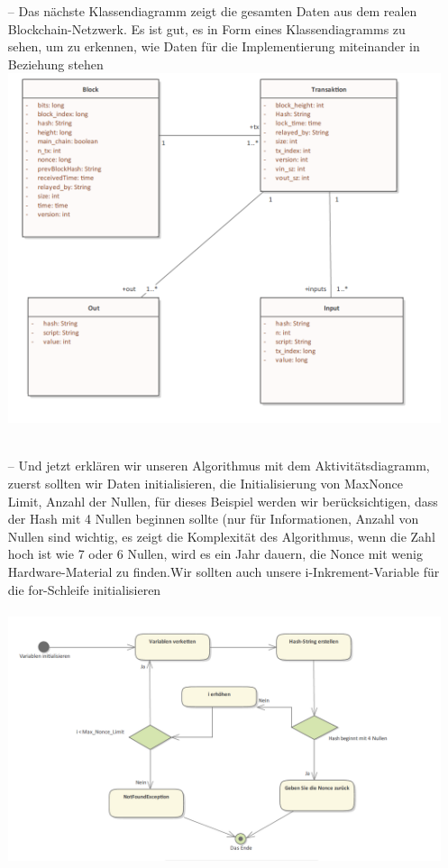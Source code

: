 \documentclass[ngerman]{scrreprt}
\begin{document}
\begin{itemize}
	\item[--] Das nächste Klassendiagramm zeigt die gesamten Daten aus dem realen Blockchain-Netzwerk. Es ist gut, es in Form eines Klassendiagramms zu sehen, um zu erkennen, wie Daten für die Implementierung miteinander in Beziehung stehen \\
	\includegraphics[width=\linewidth]{classOfStructures.png} \\ \\
	\item[--] {Und jetzt erklären wir unseren Algorithmus mit dem Aktivitätsdiagramm, zuerst sollten wir Daten initialisieren, die Initialisierung von Max\textunderscore Nonce \textunderscore Limit, Anzahl der Nullen, für dieses Beispiel werden wir berücksichtigen, dass der Hash mit 4 Nullen beginnen sollte (nur für Informationen, Anzahl von Nullen sind wichtig, es zeigt die Komplexität des Algorithmus, wenn die Zahl hoch ist wie 7 oder 6 Nullen, wird es ein Jahr dauern, die Nonce mit wenig Hardware-Material zu finden.Wir sollten auch unsere i-Inkrement-Variable für die for-Schleife initialisieren } \\ \\
		\includegraphics[width=\linewidth]{activity.png} \\ \\
		

	
\end{itemize}
\end{document}
